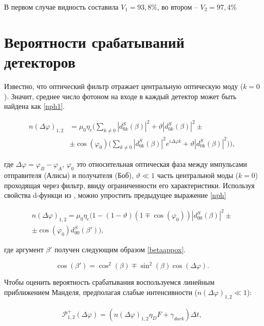 В первом случае видность составила $V_{1}=93,8\%$, во втором -- $V_{2}=97,4\%$


\pagebreak


\section{Вероятности срабатываний детекторов} \label{ch:ch5/sec6}

 Известно, что оптический фильтр отражает центральную оптическую моду ($k=0$). Значит, среднее число фотоном на входе в каждый детектор может быть найдена как \ref{nph1}. 
 
\begin{align}\label{nph1}
    n(\Delta\varphi)_{1,2}&=\mu_0\eta_c\Bigg(\sum_{k\neq 0}|d_{0k}^{S}(\beta)|^2 + \vartheta|d_{0k}^{S}(\beta)|^2 \pm \nonumber \\
    &\pm \cos(\varphi_0)\Big(\sum_{k\neq 0}|d_{0k}^{S}(\beta)|^2e^{i\Delta\varphi k}+ \vartheta|d_{0k}^{S}(\beta)|^2 \Big) \Bigg),
\end{align}

где $\Delta\varphi=\varphi_B-\varphi_A$, $\varphi_0$ это относительная оптическая фаза между импульсами отправителя (Алисы) и получателя (Боб), $\vartheta \ll 1$ часть центральной моды ($k=0$) проходящая через фильтр, ввиду ограниченности его характеристики. Используя свойства d-функци из \cite{varshalovich1988quantum}, можно упростить предыдущее выражение \ref{nph}

\begin{align}
    n(\Delta\varphi)_{1,2}=\mu_0\eta_c\Big(1-(1-\vartheta)(1\mp\cos(\varphi_0))|d_{00}^{S}(\beta)|^2 \pm \nonumber \\
    \pm\cos(\varphi_0)d_{00}^{S}(\beta')\Big) \label{nph},
\end{align}

где аргумент $\beta'$ получен следующим образом \ref{betaappox}. 

\begin{equation} \label{betaappox}
    \cos(\beta')=\cos^2(\beta) \mp \sin^2(\beta)\cos(\Delta\varphi).
\end{equation}

Чтобы оценить вероятность срабатывания воспользуемся линейным приближением Манделя, предполагая слабые интенсивности ($n(\Delta\varphi)_{1,2} \ll 1$):

\begin{eqnarray}
    \mathcal{P}_{1,2}^{+}(\Delta\varphi)=\left(n(\Delta\varphi)_{1,2}\eta_DF+\gamma_{dark}\right)\Delta t, \label{pdet}
\end{eqnarray}

